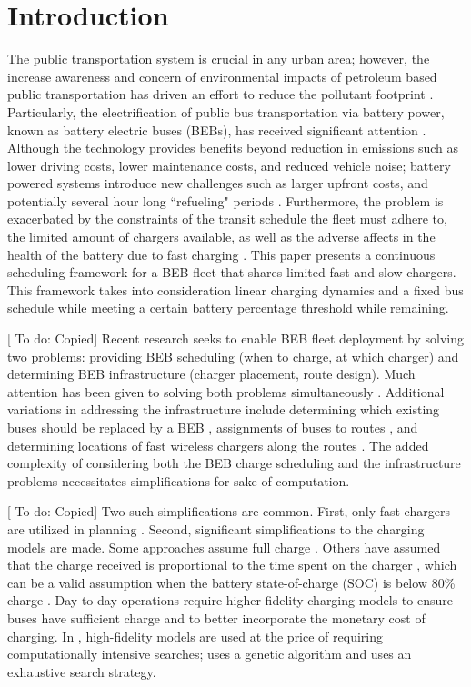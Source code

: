 \documentclass[letterpaper, 10pt, conference]{IEEEtran}
\newcommand{\TODO}[1]{{\color{green} To do: #1}} %
\begin{document}
\section{Introduction}
\label{sec:introduction}
The public transportation system is crucial in any urban area; however, the increase awareness and concern of environmental impacts of petroleum based public transportation has driven an effort to reduce the pollutant footprint \cite{DeFilippo2014, Xylia2018, Guida2017, Li2016}. Particularly, the electrification of public bus transportation via battery power, known as battery electric buses (BEBs), has received significant attention \cite{Li2016}. Although the technology provides benefits beyond reduction in emissions such as lower driving costs, lower maintenance costs, and reduced vehicle noise; battery powered systems introduce new challenges such as larger upfront costs, and potentially several hour long ``refueling" periods \cite{Xylia2018, Li2016}. Furthermore, the problem is exacerbated by the constraints of the transit schedule the fleet must adhere to, the limited amount of chargers available, as well as the adverse affects in the health of the battery due to fast charging \cite{Lutsey2019}. This paper presents a continuous scheduling framework for a BEB fleet that shares limited fast and slow chargers. This framework takes into consideration linear charging dynamics and a fixed bus schedule while meeting a certain battery percentage threshold while remaining.

[\TODO{Copied}] Recent research seeks to enable BEB fleet deployment by solving two problems: providing BEB scheduling (when to charge, at which charger) and determining BEB infrastructure (charger placement, route design). Much attention has been given to solving both problems simultaneously \cite{Wei2018, Sebastiani2016, Hoke2014, Wang2017}. Additional variations in addressing the infrastructure include determining which existing buses should be replaced by a BEB \cite{Zhou2020}, assignments of buses to routes \cite{Liu2020}, and determining locations of fast wireless chargers along the routes \cite{Yang2018, Wang2017a}. The added complexity of considering both the BEB charge scheduling and the infrastructure problems necessitates simplifications for sake of computation.

[\TODO{Copied}] Two such simplifications are common. First, only fast chargers are utilized in planning \cite{Wei2018, Sebastiani2016, Wang2017, Zhou2020, Liu2020, Yang2018, Wang2017a, Qin2016}. Second, significant simplifications to the charging models are made. Some approaches assume full charge \cite{Wei2018, Wang2017, Zhou2020, Wang2017a}. Others have assumed that the charge received is proportional to the time spent on the charger \cite{Liu2020, Yang2018}, which can be a valid assumption when the battery state-of-charge (SOC) is below 80\% charge \cite{Liu2020}. Day-to-day operations require higher fidelity charging models to ensure buses have sufficient charge and to better incorporate the monetary cost of charging. In \cite{Sebastiani2016, Qin2016}, high-fidelity models are used at the price of requiring computationally intensive searches; \cite{Sebastiani2016} uses a genetic algorithm and \cite{Qin2016} uses an exhaustive search strategy.
\end{document}
